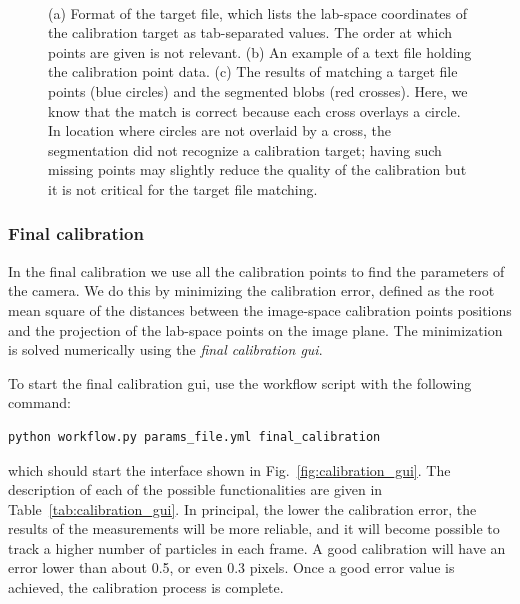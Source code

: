 \documentclass[10pt,a4paper]{article}
\begin{document}
\begin{figure}[!ht]
	\centering
	\\
	\caption{(a) Format of the target file, which lists the lab-space coordinates of the calibration target as tab-separated values. The order at which points are given is not relevant. (b) An example of a text file holding the calibration point data. (c) The results of matching a target file points (blue circles) and the segmented blobs (red crosses). Here, we know that the match is correct because each cross overlays a circle. In location where circles are not overlaid by a cross, the segmentation did not recognize a calibration target; having such missing points may slightly reduce the quality of the calibration but it is not critical for the target file matching.}
\end{figure}



\subsubsection{Final calibration}

In the final calibration we use all the calibration points to find the parameters of the camera. We do this by minimizing the calibration error, defined as the root mean square of the distances between the image-space calibration points positions and the projection of the lab-space points on the image plane. The minimization is solved numerically using the \textit{final calibration gui}. 


To start the final calibration gui, use the workflow script with the following command:
%
\begin{verbatim}
python workflow.py params_file.yml final_calibration
\end{verbatim}
%
which should start the interface shown in Fig.~\ref{fig:calibration_gui}. The description of each of the possible functionalities are given in Table~\ref{tab:calibration_gui}. In principal, the lower the calibration error, the results of the measurements will be more reliable, and it will become possible to track a higher number of particles in each frame. A good calibration will have an error lower than about 0.5, or even 0.3 pixels. Once a good error value is achieved, the calibration process is complete. 
\end{document}
